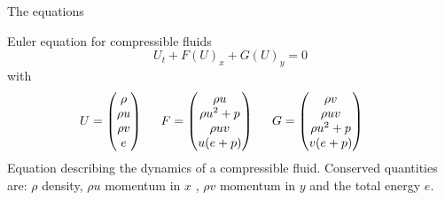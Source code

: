 \begin{frame}{The equations}

\begin{block}{Euler equation for compressible fluids}
\begin{equation*}
U_t + F(U)_x + G(U)_y = 0
\end{equation*}
with
\begin{equation*}
U =
 \begin{pmatrix}
 \rho \\
 \rho u \\
 \rho v \\
 e
 \end{pmatrix} \hspace{5 mm}
 F =
  \begin{pmatrix}
  \rho u\\
  \rho u^2 + p \\
  \rho u v\\
  u(e+p)
  \end{pmatrix} \hspace{5 mm}
   G =
    \begin{pmatrix}
    \rho v\\
    \rho u v \\
    \rho u^2 + p \\
    v(e+p)
    \end{pmatrix} \hspace{5 mm}
\end{equation*}
Equation describing the dynamics of a compressible fluid.
Conserved quantities are: $ \rho $ density, $ \rho u $ momentum in $ x $ , $ \rho v$ momentum in $ y $ and the total energy $ e $.
\end{block}

\end{frame}



